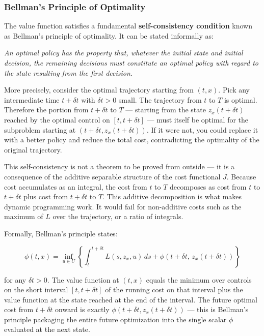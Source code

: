 \documentclass{article}
\begin{document}
\subsubsection{Bellman's Principle of Optimality}

The value function satisfies a fundamental \textbf{self-consistency condition} known as Bellman's principle of optimality. It can be stated informally as:

\begin{tldrbox}
\emph{An optimal policy has the property that, whatever the initial state and initial decision, the remaining decisions must constitute an optimal policy with regard to the state resulting from the first decision.}
\end{tldrbox}

More precisely, consider the optimal trajectory starting from $(t, x)$. Pick any intermediate time $t + \delta t$ with $\delta t > 0$ small. The trajectory from $t$ to $T$ is optimal. Therefore the portion from $t + \delta t$ to $T$ — starting from the state $z_x(t + \delta t)$ reached by the optimal control on $[t, t+\delta t]$ — must itself be optimal for the subproblem starting at $(t + \delta t, z_x(t + \delta t))$. If it were not, you could replace it with a better policy and reduce the total cost, contradicting the optimality of the original trajectory.

This self-consistency is not a theorem to be proved from outside — it is a consequence of the additive separable structure of the cost functional $J$. Because cost accumulates as an integral, the cost from $t$ to $T$ decomposes as cost from $t$ to $t+\delta t$ plus cost from $t+\delta t$ to $T$. This additive decomposition is what makes dynamic programming work. It would fail for non-additive costs such as the maximum of $L$ over the trajectory, or a ratio of integrals.

Formally, Bellman's principle states:

\begin{equation}
\phi(t, x) = \inf_{u \in U} \left\{ \int_t^{t+\delta t} L(s, z_x, u)\, ds + \phi(t + \delta t,\, z_x(t + \delta t)) \right\}
\label{eq:bellman-principle}
\end{equation}

for any $\delta t > 0$. The value function at $(t, x)$ equals the minimum over controls on the short interval $[t, t+\delta t]$ of the running cost on that interval plus the value function at the state reached at the end of the interval. The future optimal cost from $t + \delta t$ onward is exactly $\phi(t+\delta t, z_x(t+\delta t))$ — this is Bellman's principle packaging the entire future optimization into the single scalar $\phi$ evaluated at the next state.
\end{document}
